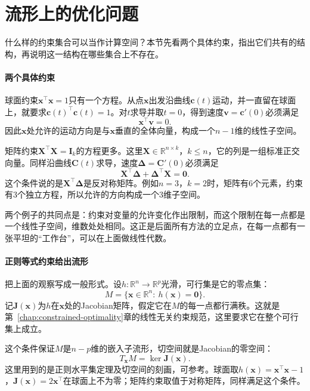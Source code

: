 \section{流形上的优化问题}
\label{sec:mfo-problems}

什么样的约束集合可以当作计算空间？本节先看两个具体约束，指出它们共有的结构，再说明这一结构在哪些集合上不存在。

\paragraph{两个具体约束}
球面约束$\bm{x}^\top\bm{x}=1$只有一个方程。从点$\bm{x}$出发沿曲线$\bm{c}(t)$运动，并一直留在球面上，就要求$\bm{c}(t)^\top\bm{c}(t)=1$。对$t$求导并取$t=0$，得到速度$\bm{v}=\bm{c}'(0)$必须满足
\[
 \bm{x}^\top\bm{v}=0.
\]
因此$\bm{x}$处允许的运动方向是与$\bm{x}$垂直的全体向量，构成一个$n-1$维的线性子空间。

矩阵约束$\bm{X}^\top\bm{X}=\bm{I}_k$的方程更多。这里$\bm{X}\in\mathbb{R}^{n\times k}$，$k\leq n$，它的列是一组标准正交向量。同样沿曲线$\bm{C}(t)$求导，速度$\bm{\Delta}=\bm{C}'(0)$必须满足
\[
 \bm{X}^\top\bm{\Delta}+\bm{\Delta}^\top\bm{X}=\bm{0}.
\]
这个条件说的是$\bm{X}^\top\bm{\Delta}$是反对称矩阵。例如$n=3$，$k=2$时，矩阵有$6$个元素，约束有$3$个独立方程，所以允许的方向构成一个$3$维子空间。

两个例子的共同点是：约束对变量的允许变化作出限制，而这个限制在每一点都是一个线性子空间，维数处处相同。这正是后面所有方法的立足点，在每一点都有一张平坦的“工作台”，可以在上面做线性代数。

\paragraph{正则等式约束给出流形}
把上面的观察写成一般形式。设$h:\mathbb{R}^n\to\mathbb{R}^p$光滑，可行集是它的零点集：
\begin{equation}
 M=\{\bm{x}\in\mathbb{R}^n:\ h(\bm{x})=\bm{0}\}.
 \label{eq:mfo-level-set}
\end{equation}
记$\bm{J}(\bm{x})$为$h$在$\bm{x}$处的Jacobian矩阵，假定它在$M$的每一点都行满秩。这就是第~\ref{chap:constrained-optimality}章的线性无关约束规范，这里要求它在整个可行集上成立。

这个条件保证$M$是$n-p$维的嵌入子流形，切空间就是Jacobian的零空间：
\begin{equation}
 T_{\bm{x}}M=\ker\bm{J}(\bm{x}).
 \label{eq:mfo-tangent}
\end{equation}
这里用到的是正则水平集定理及切空间的刻画，可参考。球面取$h(\bm{x})=\bm{x}^\top\bm{x}-1$，$\bm{J}(\bm{x})=2\bm{x}^\top$在球面上不为零；矩阵约束取值于对称矩阵，同样满足这个条件。

